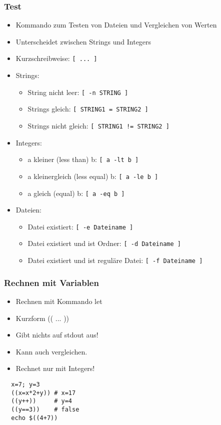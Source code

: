 \documentclass{beamer}
\begin{document}
\begin{frame}
 \frametitle{Test}
 
 \begin{itemize}
  \item Kommando zum Testen von Dateien und Vergleichen von Werten
  \item Unterscheidet zwischen Strings und Integers
  \item Kurzschreibweise: {\tt [ ... ]}
  \item Strings:
  \begin{itemize}
   \item String nicht leer: {\tt [ -n STRING ]}
   \item Strings gleich: {\tt [ STRING1 = STRING2 ]}
   \item Strings nicht gleich: {\tt [ STRING1 != STRING2 ]}
  \end{itemize}
 \item Integers:
 \begin{itemize}
  \item a kleiner (less than) b: {\tt [ a -lt b ]}
  \item a kleinergleich (less equal) b: {\tt [ a -le b ]}
  \item a gleich (equal) b: {\tt [ a -eq b ]}
 \end{itemize}
 \item Dateien:
 \begin{itemize}
  \item Datei existiert: {\tt [ -e Dateiname ]}
  \item Datei existiert und ist Ordner: {\tt [ -d Dateiname ]}
  \item Datei existiert und ist reguläre Datei: {\tt [ -f Dateiname ]}
 \end{itemize}
 \end{itemize}
\end{frame}

\begin{frame}[fragile]
 \frametitle{Rechnen mit Variablen}
 
 \begin{itemize}
  \item Rechnen mit Kommando let
  \item Kurzform (( ... ))
  \item Gibt nichts auf stdout aus!
  \item Kann auch vergleichen.
  \item Rechnet nur mit Integers!
 \end{itemize}
 \begin{lstlisting}
  x=7; y=3
  ((x=x*2+y)) # x=17
  ((y++))     # y=4
  ((y==3))    # false
  echo $((4+7))
 \end{lstlisting}
\end{frame}
\end{document}
